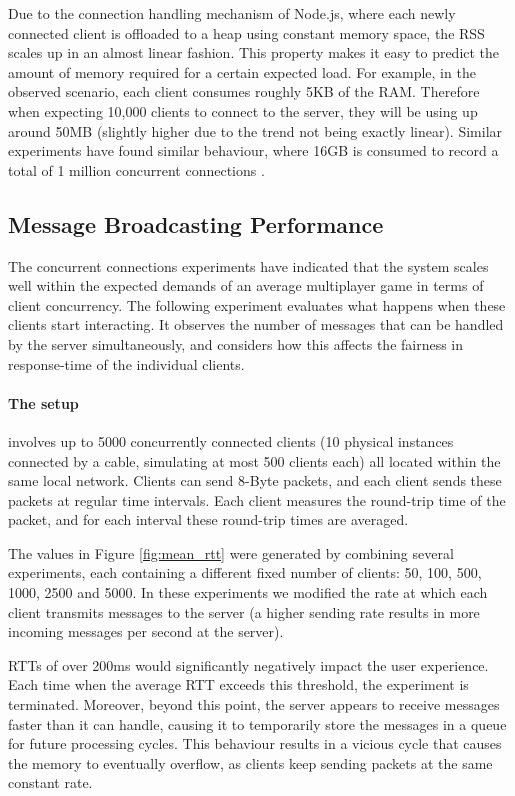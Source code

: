 \documentclass[bsc, 12pt, twoside, singlespacing, parskip, abbrevs, notimes, normalheadings, logo, deptreport]{styles/infthesis}
\begin{document}
Due to the connection handling mechanism of Node.js, where each newly connected client is offloaded to a heap using constant memory space, the RSS scales up in an almost linear fashion. This property makes it easy to predict the amount of memory required for a certain expected load. For example, in the observed scenario, each client consumes roughly 5KB of the RAM. Therefore when expecting 10,000 clients to connect to the server, they will be using up around 50MB (slightly higher due to the trend not being exactly linear). Similar experiments have found similar behaviour, where 16GB is consumed to record a total of 1 million concurrent connections \cite{modejs_1m_connections}.


\subsection{Message Broadcasting Performance}
The concurrent connections experiments have indicated that the system scales well within the expected demands of an average multiplayer game in terms of client concurrency. The following experiment evaluates what happens when these clients start interacting. It observes the number of messages that can be handled by the server simultaneously, and considers how this affects the fairness in response-time of the individual clients.
\vspace{-1em}
\paragraph*{The setup}involves up to 5000 concurrently connected clients (10 physical instances connected by a cable, simulating at most 500 clients each) all located within the same local network. Clients can send 8-Byte packets, and each client sends these packets at regular time intervals. Each client measures the round-trip time of the packet, and for each interval these round-trip times are averaged.

The values in Figure \ref{fig:mean_rtt} were generated by combining several experiments, each containing a different fixed number of clients: 50, 100, 500, 1000, 2500 and 5000. In these experiments we modified the rate at which each client transmits messages to the server (a higher sending rate results in more incoming messages per second at the server).

RTTs of over 200ms would significantly negatively impact the user experience. Each time when the average RTT exceeds this threshold, the experiment is terminated. Moreover, beyond this point, the server appears to receive messages faster than it can handle, causing it to temporarily store the messages in a queue for future processing cycles. This behaviour results in a vicious cycle that causes the memory to eventually overflow, as clients keep sending packets at the same constant rate.
\end{document}
